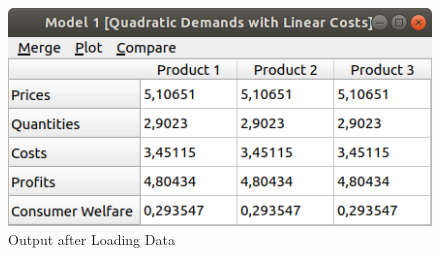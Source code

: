 \documentclass[12pt]{article}
\begin{document}
\begin{figure}
\begin{center}
  \includegraphics[width=10 cm]{first_results}
\caption{\label{first_results} Output after Loading Data}
\end{center}
\end{figure}
\end{document}

